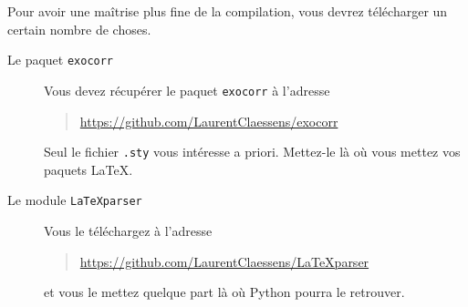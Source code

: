 \documentclass[a4paper,12pt]{article}
\newcommand{\info}[1]{\texttt{#1}}
\begin{document}
Pour avoir une maîtrise plus fine de la compilation, vous devrez télécharger un certain nombre de choses.
\begin{description}
    \item[Le paquet \info{exocorr}]
        Vous devez récupérer le paquet \info{exocorr} à l'adresse
        \begin{quote}
            \url{https://github.com/LaurentClaessens/exocorr}
        \end{quote}
        Seul le fichier \info{.sty} vous intéresse a priori. Mettez-le là où vous mettez vos paquets \LaTeX.
    \item[Le module \info{LaTeXparser}]
        Vous le téléchargez à l'adresse
        \begin{quote}
            \url{https://github.com/LaurentClaessens/LaTeXparser}
        \end{quote}
        et vous le mettez quelque part là où Python pourra le retrouver.

\end{description}
\end{document}
